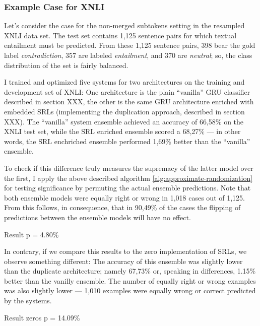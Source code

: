 \subsubsection{Example Case for XNLI}


Let's consider the case for the non-merged subtokens setting in the resampled XNLI data set. The test
set contains 1,125 sentence pairs for which textual entailment must be predicted. From these 1,125
sentence pairs, 398 bear the gold label \emph{contradiction}, 357 are labeled \emph{entailment},
and 370 are \emph{neutral}; so, the class distribution of the set is fairly balanced.

I trained and optimized five systems for two architectures on the training and development set
of XNLI: One architecture is the plain ``vanilla'' GRU classifier described in section XXX, the
other is the same GRU architecture enriched with embedded SRLs (implementing the duplication
approach, described in section XXX). The ``vanilla'' system ensemble achieved an accuracy of
66,58\% on the XNLI test set, while the SRL enriched ensemble scored a 68,27\% --- in other
words, the SRL enchriched ensemble performed 1,69\% better than the ``vanilla'' ensemble.

To check if this difference truly measures the supremacy of the latter model over the first, I
apply the above described algorithm \ref{alg:approximate-randomization} for testing significance
by permuting the actual ensemble predictions. Note that both ensemble models were equally
right or wrong in 1,018 cases out of 1,125.  From this follows, in consequence, that in 90,49\%
of the cases the flipping of predictions between the ensemble models will have no effect.

Result p = 4.80\%

In contrary, if we compare this results to the zero implementation of SRLs, we observe something
different: The accuracy of this ensemble was slightly lower than the duplicate architecture;
namely 67,73\% or, speaking in differences, 1.15\% better than the vanilly ensemble. The
number of equally right or wrong examples was also slightly lower --- 1,010 examples were
equally wrong or correct predicted by the systems.

Result zeros p = 14.09\%


